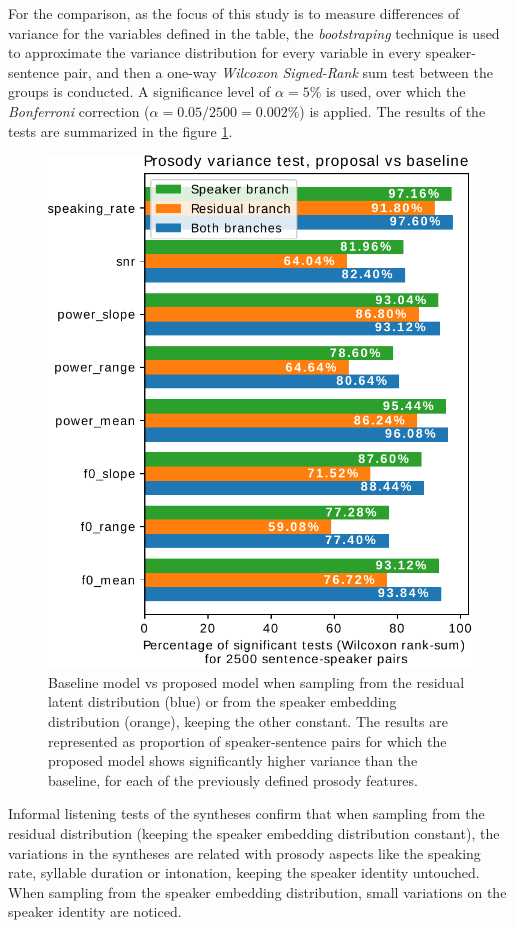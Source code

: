 For the comparison, as the focus of this study is to measure differences of variance for the variables defined in the table, the \textit{bootstraping} technique is used to approximate the variance distribution for every variable in every speaker-sentence pair, and then a one-way \textit{Wilcoxon Signed-Rank} sum test between the groups is conducted. A significance level of $\alpha=5\%$ is used, over which the \textit{Bonferroni} correction ($\alpha=0.05/2500=0.002\%$) is applied. The results of the tests are summarized in the figure \ref{fig:wilcoxon}.

\begin{figure}[h!]
	\centering
	\includegraphics[width=0.7\linewidth]{tts/images/wilcoxon}
	\caption[Comparison of prosody variability between TTS models]{Baseline model vs proposed model when sampling from the residual latent distribution (blue) or from the speaker embedding distribution (orange), keeping the other constant. The results are represented as proportion of speaker-sentence pairs for which the proposed model shows significantly higher variance than the baseline, for each of the previously defined prosody features.}
	\label{fig:wilcoxon}
\end{figure}

Informal listening tests of the syntheses confirm that when sampling from the residual distribution (keeping the speaker embedding distribution constant), the variations in the syntheses are related with prosody aspects like the speaking rate, syllable duration or intonation, keeping the speaker identity untouched. When sampling from the speaker embedding distribution, small variations on the speaker identity are noticed.



